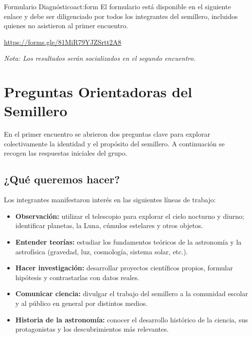 \begin{actividad}{Formulario Diagnóstico}{act:form}
    El formulario está disponible en el siguiente enlace y debe ser diligenciado por
    todos los integrantes del semillero, incluidos quienes no asistieron al primer
    encuentro.

    \medskip
    \url{https://forms.gle/81MiR79YJZSrtt2A8}

    \medskip
    \textit{Nota: Los resultados serán socializados en el segundo encuentro.}
\end{actividad}

\section{Preguntas Orientadoras del Semillero}

En el primer encuentro se abrieron dos preguntas clave para explorar colectivamente
la identidad y el propósito del semillero. A continuación se recogen las respuestas
iniciales del grupo.

\subsection{¿Qué queremos hacer?}

Los integrantes manifestaron interés en las siguientes líneas de trabajo:

\begin{itemize}[leftmargin=1.5em]
    \item \textbf{Observación:} utilizar el telescopio para explorar el cielo nocturno
          y diurno; identificar planetas, la Luna, cúmulos estelares y otros objetos.
    \item \textbf{Entender teorías:} estudiar los fundamentos teóricos de la astronomía
          y la astrofísica (gravedad, luz, cosmología, sistema solar, etc.).
    \item \textbf{Hacer investigación:} desarrollar proyectos científicos propios,
          formular hipótesis y contrastarlas con datos reales.
    \item \textbf{Comunicar ciencia:} divulgar el trabajo del semillero a la comunidad
          escolar y al público en general por distintos medios.
    \item \textbf{Historia de la astronomía:} conocer el desarrollo histórico de la
          ciencia, sus protagonistas y los descubrimientos más relevantes.
\end{itemize}

